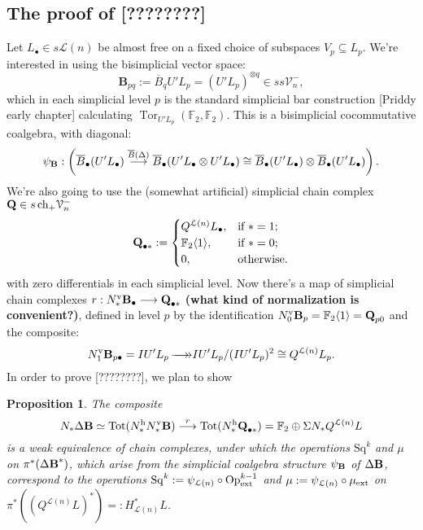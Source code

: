 \documentclass[11pt]{amsart}
\theoremstyle{plain}
\newtheorem{prop}[thm]{Proposition}
\theoremstyle{definition}
\DeclareMathOperator{\Tor}{Tor}
\renewcommand{\to}{\longrightarrow}
\newcommand{\calL}{\mathcal{L}}
\newcommand{\calV}{\mathcal{V}}
\theoremstyle{plain}
\newcommand{\vect}[2]{\calV^{#1}_{#2}}
\newcommand{\ExtCohOp}{\textup{Op}_\textup{ext}}
\newcommand{\ExtCohProd}{\mu_\textup{ext}}
\newcommand{\epi}{{\,\makebox[0cm][l]{\ensuremath\to}\to}}
\newcommand{\UEA}{U'}%
\newcommand{\Sq}{\mathrm{Sq}}
\newcommand{\F}{\mathbb{F}}
\begin{document}
\begin{appendices}
\subsection{The proof of [????????]}

Let $ L_\bullet\in s\calL(n)$ be almost free on a fixed choice of subspaces $V_p\subseteq  L_p$.
We're interested in using the bisimplicial vector space:
\[\textbf{B}_{pq}:=\overline{B}_q \UEA L_p=(\UEA L_p)^{\otimes q}\in ss\vect{-}{n},\]
which in each simplicial level $p$ is the standard simplicial bar construction [Priddy early chapter] calculating $\Tor_{\UEA L_p}(\F_2,\F_2)$.
This is a bisimplicial cocommutative coalgebra, with diagonal:
\[\psi_{\textup{\textbf{B}}}:\left(\overline{B}_\bullet (\UEA L_\bullet)\overset{\overline{B}(\Delta)}{\to}\overline{B}_\bullet (\UEA L_\bullet\otimes \UEA L_\bullet)\cong\overline{B}_\bullet (\UEA L_\bullet)\otimes \overline{B}_\bullet (\UEA L_\bullet)\right).\]
We're also going to use the (somewhat artificial) simplicial chain complex $\textbf{Q}\in s\,\textup{ch}_+\vect{-}{n}$
\[\textbf{Q}_{\bullet *}:=\begin{cases}
Q^{\calL(n)} L_\bullet,&\textup{if }*=1;\\
\F_2\langle 1\rangle,&\textup{if }*=0;
\\0,&\textup{otherwise.}
\end{cases}
\]
with zero differentials in each simplicial level. Now there's a map of simplicial chain complexes $r:N_*^\textup{v}\textbf{B}_\bullet\to \textbf{Q}_{\bullet*}$ \textbf{(what kind of normalization is convenient?)}, defined in level $p$ by the identification $N^\textup{v}_0\textbf{B}_p=\F_2\langle 1\rangle=\textbf{Q}_{p0}$ and the composite:
\[N^\textup{v}_1\textbf{B}_{p\bullet}=I\UEA L_p\epi I\UEA L_p/(I\UEA L_p)^2\cong Q^{\calL(n)} L_p.\]
In order to prove [????????], we plan to show
\begin{prop}\label{the point of the appendix} The composite
\[N_*\Delta\textbf{\textup{B}}\simeq\textup{Tot}(N^\textup{h}_*N^\textup{v}_*\textbf{\textup{B}})\overset{r}{\to} \textup{Tot}(N^\textup{h}_*\textbf{\textup{Q}}_{\bullet*})=\F_2\oplus \Sigma N_*Q^{\calL(n)} L\]
is a weak equivalence of chain complexes, under which the operations $\Sq^k$ and $\mu$ on $\pi^*(\Delta\textup{\textbf{B}}^*)$, which arise from the simplicial coalgebra structure $\psi_{\textup{\textbf{B}}}$ of $\Delta \textup{\textbf{B}}$, correspond to the operations $\Sq^k:=\psi_{\calL(n)}\circ\ExtCohOp^{k-1}$ and $\mu:=\psi_{\calL(n)}\circ\ExtCohProd$ on $\pi^*((Q^{\calL(n)} L)^*)=:H^*_{\calL(n)} L$.
\end{prop}


\end{appendices}
\end{document}
